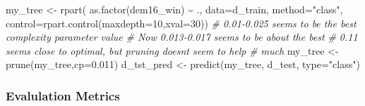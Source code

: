 \documentclass[
]{article}
\newenvironment{Shaded}{\begin{snugshade}}{\end{snugshade}}
\newcommand{\AttributeTok}[1]{\textcolor[rgb]{0.77,0.63,0.00}{#1}}
\newcommand{\CommentTok}[1]{\textcolor[rgb]{0.56,0.35,0.01}{\textit{#1}}}
\newcommand{\DecValTok}[1]{\textcolor[rgb]{0.00,0.00,0.81}{#1}}
\newcommand{\FloatTok}[1]{\textcolor[rgb]{0.00,0.00,0.81}{#1}}
\newcommand{\FunctionTok}[1]{\textcolor[rgb]{0.00,0.00,0.00}{#1}}
\newcommand{\NormalTok}[1]{#1}
\newcommand{\OtherTok}[1]{\textcolor[rgb]{0.56,0.35,0.01}{#1}}
\newcommand{\SpecialCharTok}[1]{\textcolor[rgb]{0.00,0.00,0.00}{#1}}
\newcommand{\StringTok}[1]{\textcolor[rgb]{0.31,0.60,0.02}{#1}}
\begin{document}
\begin{Shaded}
\begin{Highlighting}[]
\NormalTok{my\_tree }\OtherTok{\textless{}{-}} \FunctionTok{rpart}\NormalTok{(}
  \FunctionTok{as.factor}\NormalTok{(dem16\_win) }\SpecialCharTok{\textasciitilde{}}\NormalTok{ ., }\AttributeTok{data=}\NormalTok{d\_train, }\AttributeTok{method=}\StringTok{"class"}\NormalTok{,}
  \AttributeTok{control=}\FunctionTok{rpart.control}\NormalTok{(}\AttributeTok{maxdepth=}\DecValTok{10}\NormalTok{,}\AttributeTok{xval=}\DecValTok{30}\NormalTok{))}
\CommentTok{\# 0.01{-}0.025 seems to be the best complexity parameter value}
\CommentTok{\# Now 0.013{-}0.017 seems to be about the best}
\CommentTok{\# 0.11 seems close to optimal, but pruning doesn\textquotesingle{}t seem to help}
\CommentTok{\# much}
\NormalTok{my\_tree }\OtherTok{\textless{}{-}} \FunctionTok{prune}\NormalTok{(my\_tree,}\AttributeTok{cp=}\FloatTok{0.011}\NormalTok{)}
\NormalTok{d\_tst\_pred }\OtherTok{\textless{}{-}} \FunctionTok{predict}\NormalTok{(my\_tree, d\_test, }\AttributeTok{type=}\StringTok{"class"}\NormalTok{)}
\end{Highlighting}
\end{Shaded}

\hypertarget{evalulation-metrics}{%
\subsubsection{Evalulation Metrics}\label{evalulation-metrics}}

\begin{Shaded}
\end{Shaded}
\end{document}
